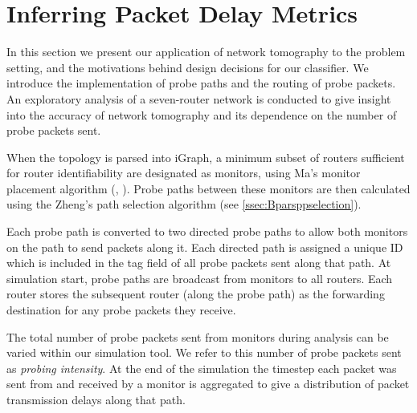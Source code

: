 \section{Inferring Packet Delay Metrics}
\label{sec:Mnetworkprobing}
In this section we present our application of network tomography to the problem setting, and the motivations behind design decisions for our classifier. We introduce the implementation of probe paths and the routing of probe packets. An exploratory analysis of a seven-router network is conducted to give insight into the accuracy of network tomography and its dependence on the number of probe packets sent.\par
When the topology is parsed into iGraph, a minimum subset of routers sufficient for router identifiability are designated as monitors, using Ma's monitor placement algorithm (\cite{ma_optimal_2015}, \cite{barnes_stochastic_2020}). Probe paths between these monitors are then calculated using the Zheng's path selection algorithm (see \cref{ssec:Bparsppselection}).\par
Each probe path is converted to two directed probe paths to allow both monitors on the path to send packets along it. Each directed path is assigned a unique ID which is included in the tag field of all probe packets sent along that path. At simulation start, probe paths are broadcast from monitors to all routers. Each router stores the subsequent router (along the probe path) as the forwarding destination for any probe packets they receive.\par
The total number of probe packets sent from monitors during analysis can be varied within our simulation tool. We refer to this number of probe packets sent as \textit{probing intensity}. At the end of the simulation the timestep each packet was sent from and received by a monitor is aggregated to give a distribution of packet transmission delays along that path.\par
